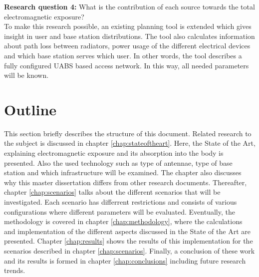 \textbf{Research question 4:} What is the contribution of each source towards the total electromagnetic exposure?\\

To make this research possible, an existing planning tool is extended which gives insight in user and base station distributions.
The tool also calculates information about path loss between radiators, power usage of the different electrical devices and which base station serves which user. In other words, the tool describes 
a fully configured \gls{UABS} based access network.
In this way, all needed parameters will be known.

\section{Outline}
\label{sec:structure}

This section briefly describes the structure of this document.
Related research to the subject is discussed in chapter  \ref{chap:stateoftheart}. 
Here, the State of the Art, explaining electromagnetic exposure and its absorption into the body is presented.  
Also the used technology such as type of antennae, type of base station and which infrastructure will be examined. 
The chapter also discusses why this master dissertation differs from other research documents. 
Thereafter, chapter \ref{chap:scenarios} talks about the different scenarios that will be
investigated. Each scenario has differrent restrictions and consists of various configurations where different parameters will be evaluated.
 Eventually, the methodology is covered in chapter \ref{chap:methodology}, where the calculations and implementation 
 of the different aspects discussed in the State of the Art are presented. 
 Chapter \ref{chap:results} shows the results of this implementation for the scenarios described in chapter \ref{chap:scenarios}. 
 Finally, a conclusion of these work and its results is formed in chapter \ref{chap:conclusions} including future research trends.